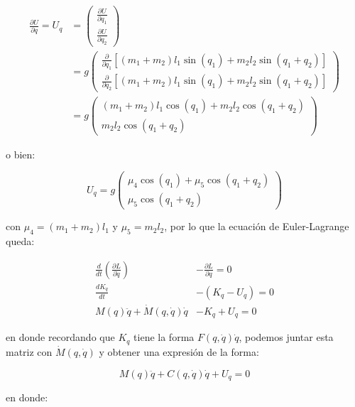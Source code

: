 \documentclass{article}
\begin{document}
\[
\begin{align}
\frac{\partial U}{\partial q} = U_q &=
\begin{pmatrix}
\frac{\partial U}{\partial q_1} \\
\frac{\partial U}{\partial q_2}
\end{pmatrix} \\
&= g
\begin{pmatrix}
\frac{\partial}{\partial q_1} \left[ \left( m_1 + m_2 \right) l_1 \sin{(q_1)} + m_2 l_2 \sin{(q_1 + q_2)} \right] \\
\frac{\partial}{\partial q_2} \left[ \left( m_1 + m_2 \right) l_1 \sin{(q_1)} + m_2 l_2 \sin{(q_1 + q_2)} \right]
\end{pmatrix} \\
&= g
\begin{pmatrix}
\left( m_1 + m_2 \right) l_1 \cos{(q_1)} + m_2 l_2 \cos{(q_1 + q_2)} \\
m_2 l_2 \cos{(q_1 + q_2)}
\end{pmatrix}
\end{align}
\]

o bien:

\[
U_q = g
\begin{pmatrix}
\mu_4 \cos{(q_1)} + \mu_5 \cos{(q_1 + q_2)} \\
\mu_5 \cos{(q_1 + q_2)}
\end{pmatrix}
\]

con \(\mu_4 = \left( m_1 + m_2 \right) l_1\) y \(\mu_5 = m_2 l_2\), por
lo que la ecuación de Euler-Lagrange queda:

\[
\begin{align}
\frac{d}{dt} \left( \frac{\partial L}{\partial \dot{q}} \right) &- \frac{\partial L}{\partial q} = 0 \\
\frac{d K_{\dot{q}}}{dt} &- \left( K_q - U_q \right) = 0 \\
M(q) \ddot{q} + \dot{M}(q, \dot{q}) \dot{q} &- K_q + U_q = 0
\end{align}
\]

en donde recordando que \(K_q\) tiene la forma
\(F(q, \dot{q}) \dot{q}\), podemos juntar esta matriz con
\(\dot{M}(q, \dot{q})\) y obtener una expresión de la forma:

\[
M(q) \ddot{q} + C(q, \dot{q}) \dot{q} + U_q = 0
\]

en donde:
\end{document}
